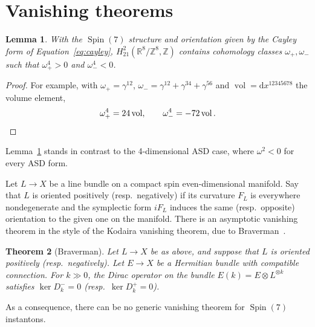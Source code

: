 \documentclass{article}
\newcommand{\di}{\mathrm{d}}
\newcommand{\real}{\mathbb{R}}
\newcommand{\inte}{\mathbb{Z}}
\DeclareMathOperator\Spin{Spin}
\DeclareMathOperator\vol{vol}
\newtheorem{theorem}{Theorem}
\newtheorem{lemma}[theorem]{Lemma}
\theoremstyle{definition}
\theoremstyle{remark}
\begin{document}
\section{Vanishing theorems}
\label{sec:vanishing}

\begin{lemma}
    \label{lem:plusminuscoho}
    With the $\Spin(7)$ structure and orientation given by the Cayley form of Equation~\eqref{eq:cayley}, $H^2_{21}(\real^8/\inte^8, \inte)$ contains cohomology classes $\omega_+, \omega_-$ such that $\omega_+^4 > 0$ and $\omega_-^4 < 0$.
\end{lemma}
\begin{proof}
    For example, with $\omega_+ = \gamma^{12}$, $\omega_- = \gamma^{12} + \gamma^{34} + \gamma^{56}$ and $\vol = \di x^{12345678}$ the volume element,
    \[
        \omega_+^4 = 24 \vol,\qquad \omega_-^4 = -72\vol.\qedhere
    \]
\end{proof}

Lemma~\ref{lem:plusminuscoho} stands in contrast to the 4-dimensional ASD case, where $\omega^2 < 0$ for every ASD form.


Let $L \to X$ be a line bundle on a compact spin even-dimensional manifold.
Say that $L$ is oriented positively (resp.\ negatively) if its curvature $F_L$ is everywhere nondegenerate and the symplectic form $i F_L$ induces the same (resp.\ opposite) orientation to the given one on the manifold.
There is an asymptotic vanishing theorem in the style of the Kodaira vanishing theorem, due to Braverman~{\cite[Theorem~3.2]{bravermanVanishingTheoremsKernel1998}}.
\begin{theorem}[Braverman]
    \label{thm:vanishing}
    Let $L \to X$ be as above, and suppose that $L$ is oriented positively (resp.\ negatively).
    Let $E \to X$ be a Hermitian bundle with compatible connection.
    For $k \gg 0$, the Dirac operator on the bundle $E(k) = E \otimes L^{\otimes k}$ satisfies $\ker D^-_k = 0$ (resp.\ $\ker D^+_k = 0$).
\end{theorem}

As a consequence, there can be no generic vanishing theorem for $\Spin(7)$ instantons.
\end{document}
